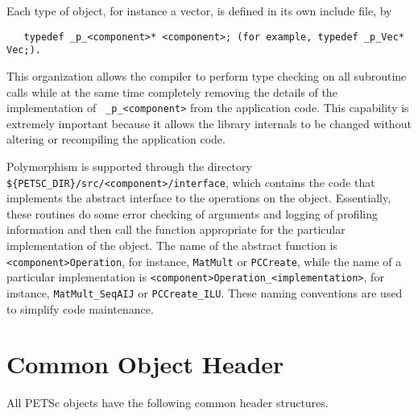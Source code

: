 Each type of object, for instance a vector, is defined in its own
include file, by 
\begin{verbatim}
   typedef _p_<component>* <component>; (for example, typedef _p_Vec* Vec;).
\end{verbatim}
  This organization
allows the compiler to perform type checking on all subroutine calls
while at the same time
completely removing the details of the implementation of {\tt
\_p\_<component>} from the application code.  This capability is extremely important
because it allows the library internals to be changed
without altering or recompiling the application code.

Polymorphism is supported through the directory 
{\tt \$\{PETSC\_DIR\}/src/<component>/interface},
which contains the code that implements the abstract interface to the
operations on the object.  Essentially, these routines do some error
checking of arguments and logging of profiling information 
and then call the function appropriate for the
particular implementation of the object. The name of the abstract
function is {\tt <component>Operation}, for instance, {\tt MatMult} or {\tt PCCreate}, while
the name of a particular implementation is 
{\tt <component>Operation\_<implementation>}, for instance, 
{\tt MatMult\_SeqAIJ} or {\tt PCCreate\_ILU}. These naming
conventions are used to simplify code maintenance.

\section{Common Object Header}

All PETSc objects have the following common header structures.

